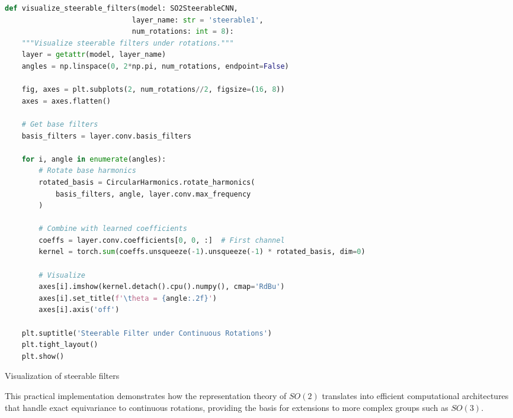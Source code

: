 \begin{listing}[h]
\begin{lstlisting}[language=Python]
def visualize_steerable_filters(model: SO2SteerableCNN,
                              layer_name: str = 'steerable1',
                              num_rotations: int = 8):
    """Visualize steerable filters under rotations."""
    layer = getattr(model, layer_name)
    angles = np.linspace(0, 2*np.pi, num_rotations, endpoint=False)

    fig, axes = plt.subplots(2, num_rotations//2, figsize=(16, 8))
    axes = axes.flatten()

    # Get base filters
    basis_filters = layer.conv.basis_filters

    for i, angle in enumerate(angles):
        # Rotate base harmonics
        rotated_basis = CircularHarmonics.rotate_harmonics(
            basis_filters, angle, layer.conv.max_frequency
        )

        # Combine with learned coefficients
        coeffs = layer.conv.coefficients[0, 0, :]  # First channel
        kernel = torch.sum(coeffs.unsqueeze(-1).unsqueeze(-1) * rotated_basis, dim=0)

        # Visualize
        axes[i].imshow(kernel.detach().cpu().numpy(), cmap='RdBu')
        axes[i].set_title(f'\theta = {angle:.2f}')
        axes[i].axis('off')

    plt.suptitle('Steerable Filter under Continuous Rotations')
    plt.tight_layout()
    plt.show()
\end{lstlisting}
\caption{Visualization of steerable filters}
\label{code:visualize_steerable}
\end{listing}

This practical implementation demonstrates how the representation theory of $SO(2)$ translates into efficient computational architectures that handle exact equivariance to continuous rotations, providing the basis for extensions to more complex groups such as $SO(3)$.
